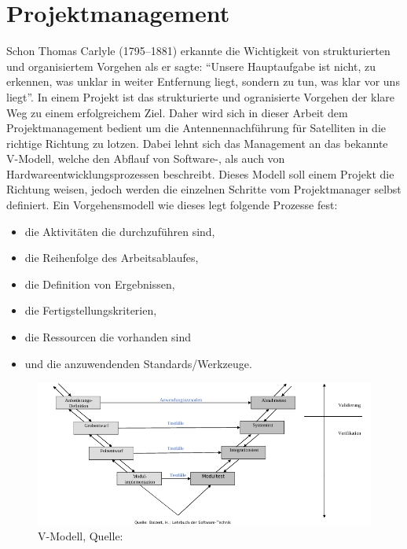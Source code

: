 
\chapter{Projektmanagement}
Schon Thomas Carlyle (1795–1881) erkannte die Wichtigkeit von strukturierten und organisiertem Vorgehen als er sagte:\newpar
``Unsere Hauptaufgabe ist nicht, zu erkennen, was unklar in weiter Entfernung liegt, sondern zu tun, was klar vor uns liegt''.\newpar
In einem Projekt ist das strukturierte und ogranisierte Vorgehen der klare Weg zu einem erfolgreichem Ziel. Daher wird sich in dieser Arbeit
dem Projektmanagement bedient um die Antennennachführung für Satelliten in die richtige Richtung zu lotzen. Dabei lehnt sich das Management an 
das bekannte V-Modell, welche den Abflauf von Software-, als auch von Hardwareentwicklungsprozessen beschreibt. Dieses Modell soll einem Projekt 
die Richtung weisen, jedoch werden die einzelnen Schritte vom Projektmanager selbst definiert. Ein Vorgehensmodell wie dieses legt folgende
Prozesse fest:
\begin{itemize}
 \item die Aktivitäten die durchzuführen sind,
 \item die Reihenfolge des Arbeitsablaufes,
 \item die Definition von Ergebnissen,
 \item die Fertigstellungskriterien,
 \item die Ressourcen die vorhanden sind
 \item und die anzuwendenden Standards/Werkzeuge.
\end{itemize}
\begin{figure}[h]
 \centering
 \includegraphics[width=0.8\linewidth]{./images/vmodell}
 \caption{V-Modell, Quelle: \cite{swscript}} %
 \label{fig:vmodell}
\end{figure}
